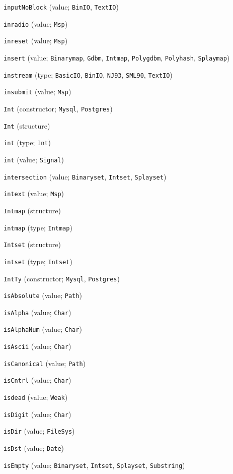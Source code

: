 \begin{description}
\item[] \verb"inputNoBlock" (value; \verb"BinIO", \verb"TextIO")
\item[] \verb"inradio" (value; \verb"Msp")
\item[] \verb"inreset" (value; \verb"Msp")
\item[] \verb"insert" (value; \verb"Binarymap", \verb"Gdbm", \verb"Intmap", \verb"Polygdbm", \verb"Polyhash", \verb"Splaymap")
\item[] \verb"instream" (type; \verb"BasicIO", \verb"BinIO", \verb"NJ93", \verb"SML90", \verb"TextIO")
\item[] \verb"insubmit" (value; \verb"Msp")
\item[] \verb"Int" (constructor; \verb"Mysql", \verb"Postgres")
\item[] \verb"Int" (structure)
\item[] \verb"int" (type; \verb"Int")
\item[] \verb"int" (value; \verb"Signal")
\item[] \verb"intersection" (value; \verb"Binaryset", \verb"Intset", \verb"Splayset")
\item[] \verb"intext" (value; \verb"Msp")
\item[] \verb"Intmap" (structure)
\item[] \verb"intmap" (type; \verb"Intmap")
\item[] \verb"Intset" (structure)
\item[] \verb"intset" (type; \verb"Intset")
\item[] \verb"IntTy" (constructor; \verb"Mysql", \verb"Postgres")
\item[] \verb"isAbsolute" (value; \verb"Path")
\item[] \verb"isAlpha" (value; \verb"Char")
\item[] \verb"isAlphaNum" (value; \verb"Char")
\item[] \verb"isAscii" (value; \verb"Char")
\item[] \verb"isCanonical" (value; \verb"Path")
\item[] \verb"isCntrl" (value; \verb"Char")
\item[] \verb"isdead" (value; \verb"Weak")
\item[] \verb"isDigit" (value; \verb"Char")
\item[] \verb"isDir" (value; \verb"FileSys")
\item[] \verb"isDst" (value; \verb"Date")
\item[] \verb"isEmpty" (value; \verb"Binaryset", \verb"Intset", \verb"Splayset", \verb"Substring")

\end{description}
